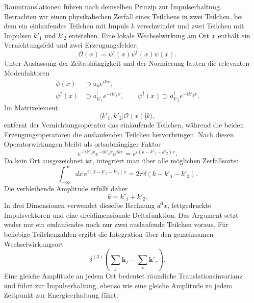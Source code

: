 Raumtranslationen führen nach demselben Prinzip zur Impulserhaltung. Betrachten wir einen physikalischen Zerfall eines Teilchens in zwei Teilchen, bei dem ein einlaufendes Teilchen mit Impuls \(k\) verschwindet und zwei Teilchen mit Impulsen \(k'_1\) und \(k'_2\) entstehen. Eine lokale Wechselwirkung am Ort \(x\) enthält ein Vernichtungsfeld und zwei Erzeugungsfelder:
\begin{equation}
\mathcal{O}(x)=\psi^\dagger(x)\psi^\dagger(x)\psi(x).
\end{equation}
Unter Auslassung der Zeitabhängigkeit und der Normierung lauten die relevanten Modenfaktoren
\begin{align}
\psi(x)&\supset a_k e^{ikx},
\\
\psi^\dagger(x)&\supset a_{k'_1}^\dagger e^{-ik'_1x},
\qquad
\psi^\dagger(x)\supset a_{k'_2}^\dagger e^{-ik'_2x}.
\end{align}
Im Matrixelement
\begin{equation}
\langle k'_1,k'_2|\mathcal{O}(x)|k\rangle,
\end{equation}
entfernt der Vernichtungsoperator das einlaufende Teilchen, während die beiden Erzeugungsoperatoren die auslaufenden Teilchen hervorbringen. Nach diesen Operatorwirkungen bleibt als ortsabhängiger Faktor
\begin{equation}
e^{-ik'_1x}e^{-ik'_2x}e^{ikx}
=e^{i(k-k'_1-k'_2)x}.
\end{equation}
Da kein Ort ausgezeichnet ist, integriert man über alle möglichen Zerfallsorte:
\begin{equation}
\int_{-\infty}^{\infty}dx\,
e^{i(k-k'_1-k'_2)x}
=2\pi\delta(k-k'_1-k'_2).
\end{equation}
Die verbleibende Amplitude erfüllt daher
\begin{equation}
k=k'_1+k'_2.
\end{equation}
In drei Dimensionen verwendet dieselbe Rechnung \(d^3x\), fettgedruckte Impulsvektoren und eine dreidimensionale Deltafunktion. Das Argument setzt weder nur ein einlaufendes noch nur zwei auslaufende Teilchen voraus. Für beliebige Teilchenzahlen ergibt die Integration über den gemeinsamen Wechselwirkungsort
\begin{equation}
\delta^{(3)}\!\left(
\sum_j\mathbf{k}_j-\sum_r\mathbf{k}'_r
\right).
\end{equation}
Eine gleiche Amplitude an jedem Ort bedeutet räumliche Translationsinvarianz und führt zur Impulserhaltung, ebenso wie eine gleiche Amplitude zu jedem Zeitpunkt zur Energieerhaltung führt.

